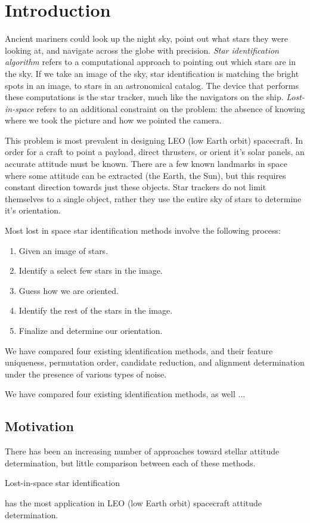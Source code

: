 \section{Introduction}
Ancient mariners could look up the night sky, point out what stars they were looking at, and navigate across the globe with precision. \textit{Star identification algorithm} refers to a computational approach to pointing out which stars are in the sky. If we take an image of the sky, star identification is matching the bright spots in an image, to stars in an astronomical catalog. The device that performs these computations is the star tracker, much like the navigators on the ship. \textit{Lost-in-space} refers to an additional constraint on the problem: the absence of knowing where we took the picture and how we pointed the camera.

This problem is most prevalent in designing  LEO (low Earth orbit) spacecraft. In order for a craft to point a payload, direct thrusters, or orient it's solar panels, an accurate attitude must be known. There are a few known landmarks in space where some attitude can be extracted (the Earth, the Sun), but this requires constant direction towards just these objects. Star trackers do not limit themselves to a single object, rather they use the entire sky of stars to determine it's orientation. 

Most lost in space star identification methods involve the following process:
\begin{enumerate}
\item Given an image of stars.
\item Identify a select few stars in the image.
\item Guess how we are oriented.
\item Identify the rest of the stars in the image.
\item Finalize and determine our orientation.
\end{enumerate}

We have compared four existing identification methods, and their feature uniqueness, permutation order, candidate reduction, and alignment determination under the presence of various types of noise. 

We have compared four existing identification methods, as well ...

\subsection{Motivation}
There has been an increasing number of approaches toward stellar attitude determination, but little comparison between each of these methods. 



Lost-in-space star identification 

has the most application in LEO (low Earth orbit) spacecraft attitude determination. 